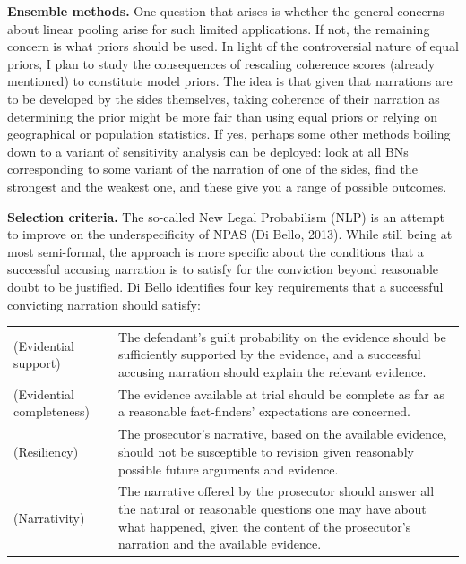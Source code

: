 \documentclass[11pt,dvipsnames,enabledeprecatedfontcommands]{scrartcl}
\begin{document}
\noindent
\textbf{Ensemble methods.} One question that arises is whether the
general concerns about linear pooling arise for such limited
applications. If not, the remaining concern is what priors should be
used. In light of the controversial nature of equal priors, I plan to
study the consequences of rescaling coherence scores (already mentioned)
to constitute model priors. The idea is that given that narrations are
to be developed by the sides themselves, taking coherence of their
narration as determining the prior might be more fair than using equal
priors or relying on geographical or population statistics. If yes,
perhaps some other methods boiling down to a variant of sensitivity
analysis can be deployed: look at all BNs corresponding to some variant
of the narration of one of the sides, find the strongest and the weakest
one, and these give you a range of possible outcomes.

\noindent
 \textbf{Selection criteria.} The so-called New Legal Probabilism (NLP)
is an attempt to improve on the underspecificity of NPAS (Di Bello,
2013). While still being at most semi-formal, the approach is more
specific about the conditions that a successful accusing narration is to
satisfy for the conviction beyond reasonable doubt to be justified. Di
Bello identifies four key requirements that a successful convicting
narration should satisfy:

\vspace{2mm}

\begin{center}
\begin{tabular}{@{}lp{11.5cm}@{}}
\toprule
 (Evidential support) &The defendant's guilt probability on the evidence should be sufficiently supported by the evidence, and a successful accusing narration should explain the relevant evidence. \\
(Evidential completeness) &  The evidence available at trial should be complete as far as a reasonable fact-finders' expectations are concerned. \\
(Resiliency)&  The prosecutor's narrative, based on the available evidence, should not be susceptible to revision given reasonably possible future arguments and evidence. \\
(Narrativity) & The narrative offered by the prosecutor should answer all 
the natural or reasonable questions one may have about what happened, given the content of the prosecutor's narration and the available evidence. \\
\bottomrule
\end{tabular}
\end{center}
\end{document}
